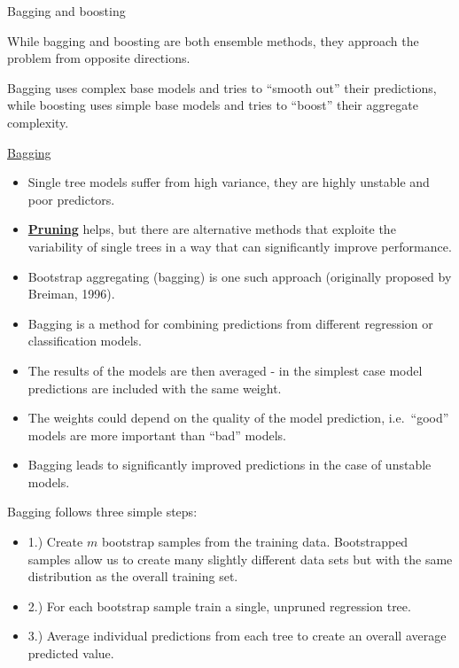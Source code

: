 \documentclass[
  10pt,
  ignorenonframetext,
]{beamer}
\providecommand{\tightlist}{%
  \setlength{\itemsep}{0pt}\setlength{\parskip}{0pt}}
\begin{document}
\begin{frame}{Bagging and boosting}
\protect\hypertarget{bagging-and-boosting}{}

While bagging and boosting are both ensemble methods, they approach the
problem from opposite directions.

Bagging uses complex base models and tries to ``smooth out'' their
predictions, while boosting uses simple base models and tries to
``boost'' their aggregate complexity.

\end{frame}

\begin{frame}{\href{https://www.r-bloggers.com/improve-predictive-performance-in-r-with-bagging/}{Bagging}}
\protect\hypertarget{bagging-1}{}

\begin{itemize}
\tightlist
\item
  Single tree models suffer from high variance, they are highly unstable
  and poor predictors.
\item
  \href{https://en.wikipedia.org/wiki/Decision_tree_pruning}{\textbf{Pruning}}
  helps, but there are alternative methods that exploite the variability
  of single trees in a way that can significantly improve performance.
\item
  Bootstrap aggregating (bagging) is one such approach (originally
  proposed by Breiman, 1996).
\item
  Bagging is a method for combining predictions from different
  regression or classification models.
\item
  The results of the models are then averaged - in the simplest case
  model predictions are included with the same weight.
\item
  The weights could depend on the quality of the model prediction,
  i.e.~``good'' models are more important than ``bad'' models.
\item
  Bagging leads to significantly improved predictions in the case of
  unstable models.
\end{itemize}

\end{frame}

\begin{frame}{Bagging follows three simple steps:}
\protect\hypertarget{bagging-follows-three-simple-steps}{}

\begin{itemize}
\item
  1.) Create \(m\) bootstrap samples from the training data.
  Bootstrapped samples allow us to create many slightly different data
  sets but with the same distribution as the overall training set.
\item
  2.) For each bootstrap sample train a single, unpruned regression
  tree.
\item
  3.) Average individual predictions from each tree to create an overall
  average predicted value.
\end{itemize}

\end{frame}
\end{document}
